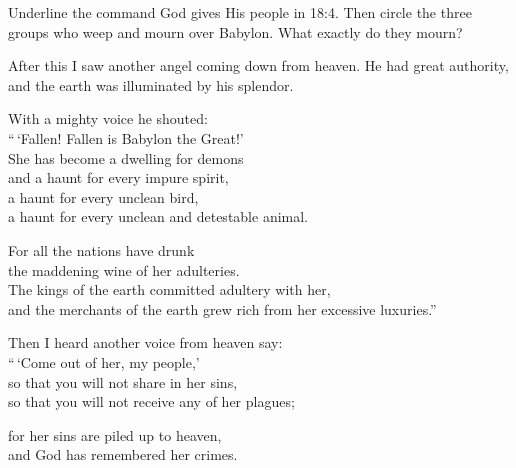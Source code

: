 \begin{ScriptureBox2}{Underline the command God gives His people in 18:4. Then circle the three groups who weep and mourn over Babylon. What exactly do they mourn?}

\item[18:1] After this I saw another angel coming down from heaven. He had great authority, and the earth was illuminated by his splendor.

\item[18:2] With a mighty voice he shouted:\\
\hspace*{1em}``\,`Fallen! Fallen is Babylon the Great!'\\
\hspace*{2em}She has become a dwelling for demons\\
\hspace*{1em}and a haunt for every impure spirit,\\
\hspace*{2em}a haunt for every unclean bird,\\
\hspace*{2em}a haunt for every unclean and detestable animal.

\item[18:3] \hspace*{1em}For all the nations have drunk\\
\hspace*{2em}the maddening wine of her adulteries.\\
\hspace*{1em}The kings of the earth committed adultery with her,\\
\hspace*{2em}and the merchants of the earth grew rich from her excessive luxuries.''

\item[18:4] Then I heard another voice from heaven say:\\
\hspace*{1em}``\,`Come out of her, my people,'\\
\hspace*{2em}so that you will not share in her sins,\\
\hspace*{2em}so that you will not receive any of her plagues;

\item[18:5] \hspace*{1em}for her sins are piled up to heaven,\\
\hspace*{2em}and God has remembered her crimes.


\end{ScriptureBox2}
